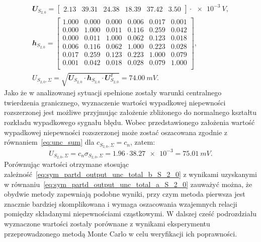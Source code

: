 \begin{gather}
\mathbfit{U}_{S_{2,0}} =
\begin{bmatrix}
\num{2.13} & \num{39.31} & \num{24.38} & \num{18.39} & \num{37.42} & \num{3.50}
\end{bmatrix} \cdot \qty{e-3}{V}
\label{eq:sym_partd_output_unc_sumuvectval_S_2_0_a}, \\
\mathbfit{h}_{S_{2,0}} =
\begin{bmatrix}
\num{1.000} & \num{0.000} & \num{0.000} & \num{0.006} & \num{0.017} & \num{0.001} \\
\num{0.000} & \num{1.000} & \num{0.011} & \num{0.116} & \num{0.259} & \num{0.042} \\
\num{0.000} & \num{0.011} & \num{1.000} & \num{0.062} & \num{0.123} & \num{0.018} \\
\num{0.006} & \num{0.116} & \num{0.062} & \num{1.000} & \num{0.223} & \num{0.028} \\
\num{0.017} & \num{0.259} & \num{0.123} & \num{0.223} & \num{1.000} & \num{0.079} \\
\num{0.001} & \num{0.042} & \num{0.018} & \num{0.028} & \num{0.079} & \num{1.000} \\
\end{bmatrix}
\label{eq:sym_partd_output_unc_sumcoherval_S_2_0_a}, \\
U_{S_{2,0},\Sigma} = \sqrt{\mathbfit{U}_{S_{2,0}} \cdot \mathbfit{h}_{S_{2,0}} \cdot \mathbfit{U}_{S_{2,0}}^{T}} = \qty{74.00}{mV} \label{eq:sym_partd_output_unc_total_a_S_2_0}.
\end{gather}
Jako że w analizowanej sytuacji spełnione zostały warunki centralnego twierdzenia granicznego, wyznaczenie wartości wypadkowej niepewności rozszerzonej jest możliwe przyjmując założenie zbliżonego do normalnego kształtu rozkładu wypadkowego sygnału błędu. Wobec przedstawionego założenia wartość wypadkowej niepewności rozszerzonej może zostać oszacowana zgodnie z równaniem~\eqref{eq:unc_sum} dla $c_{S_{2,0},\Sigma} = c_{n}$, zatem:
\begin{equation}
U_{S_{2,0},\Sigma} = c_{n} \sigma_{S_{2,0},\Sigma} = \num{1.96} \cdot \num{38.27e-3} = \qty{75.01}{mV} \label{eq:sym_partd_output_unc_total_b_S_2_0}.
\end{equation}
Porównując wartości otrzymane stosując zależność~\eqref{eq:sym_partd_output_unc_total_b_S_2_0} z wynikami uzyskanymi w równaniu~\eqref{eq:sym_partd_output_unc_total_a_S_2_0} zauważyć można, że obydwie metody zapewniają podobne wyniki, przy czym metoda pierwsza jest znacznie bardziej skomplikowana i wymaga oszacowania wzajemnych relacji pomiędzy składanymi niepewnościami cząstkowymi. W dalszej cześć podrozdziału wyznaczone wartości zostały porównane z wynikami eksperymentu przeprowadzonego metodą Monte Carlo w celu weryfikacji ich poprawności.

